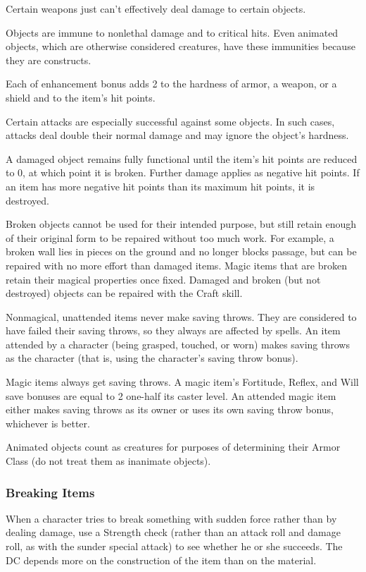  Certain weapons just can't effectively deal damage to certain objects.

 Objects are immune to nonlethal damage and to critical hits. Even animated objects, which are otherwise considered creatures, have these immunities because they are constructs.

 Each  of enhancement bonus adds 2 to the hardness of armor, a weapon, or a shield and  to the item's hit points.

 Certain attacks are especially successful against some objects. In such cases, attacks deal double their normal damage and may ignore the object's hardness.

 A damaged object remains fully functional until the item's hit points are reduced to 0, at which point it is broken. Further damage applies as negative hit points. If an item has more negative hit points than its maximum hit points, it is destroyed.

Broken objects cannot be used for their intended purpose, but still retain enough of their original form to be repaired without too much work. For example, a broken wall lies in pieces on the ground and no longer blocks passage, but can be repaired with no more effort than damaged items. Magic items that are broken retain their magical properties once fixed. Damaged and broken (but not destroyed) objects can be repaired with the Craft skill.

 Nonmagical, unattended items never make saving throws. They are considered to have failed their saving throws, so they always are affected by spells. An item attended by a character (being grasped, touched, or worn) makes saving throws as the character (that is, using the character's saving throw bonus).

\par Magic items always get saving throws. A magic item's Fortitude, Reflex, and Will save bonuses are equal to 2 \add one-half its caster level. An attended magic item either makes saving throws as its owner or uses its own saving throw bonus, whichever is better.

 Animated objects count as creatures for purposes of determining their Armor Class (do not treat them as inanimate objects).

\subsubsection{Breaking Items}
When a character tries to break something with sudden force rather than by dealing damage, use a Strength check (rather than an attack roll and damage roll, as with the sunder special attack) to see whether he or she succeeds. The DC depends more on the
construction of the item than on the material.

